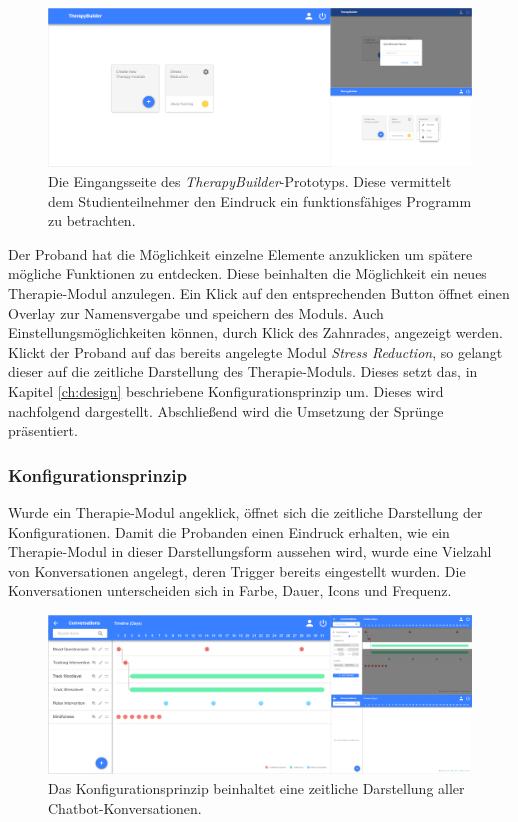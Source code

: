 \begin{figure}[h]
\centering
\includegraphics[width=1\textwidth]{pictures/start}
\caption{Die Eingangsseite des \emph{TherapyBuilder}-Prototyps. Diese vermittelt dem Studienteilnehmer den Eindruck ein funktionsfähiges Programm zu betrachten.}
\label{start}
\end{figure}

Der Proband hat die Möglichkeit einzelne Elemente anzuklicken um spätere mögliche Funktionen zu entdecken. Diese beinhalten die Möglichkeit ein neues Therapie-Modul anzulegen. Ein Klick auf den entsprechenden Button öffnet einen Overlay zur Namensvergabe und speichern des Moduls. Auch Einstellungsmöglichkeiten können, durch Klick des Zahnrades, angezeigt werden. Klickt der Proband auf das bereits angelegte Modul \emph{Stress Reduction}, so gelangt dieser auf die zeitliche Darstellung des Therapie-Moduls. Dieses setzt das, in Kapitel \ref{ch:design} beschriebene Konfigurationsprinzip um. Dieses wird nachfolgend dargestellt. Abschließend wird die Umsetzung der Sprünge präsentiert.

\subsubsection{Konfigurationsprinzip}
Wurde ein Therapie-Modul angeklick, öffnet sich die zeitliche Darstellung der Konfigurationen. Damit die Probanden einen Eindruck erhalten, wie ein Therapie-Modul in dieser Darstellungsform aussehen wird, wurde eine Vielzahl von Konversationen angelegt, deren Trigger bereits eingestellt wurden. Die Konversationen unterscheiden sich in Farbe, Dauer, Icons und Frequenz. 
 
\begin{figure}[h]
\centering
\includegraphics[width=1\textwidth]{pictures/zeitstrahl}
\caption{Das Konfigurationsprinzip beinhaltet eine zeitliche Darstellung aller Chatbot-Konversationen.}
\label{zeitstrahl}
\end{figure}

